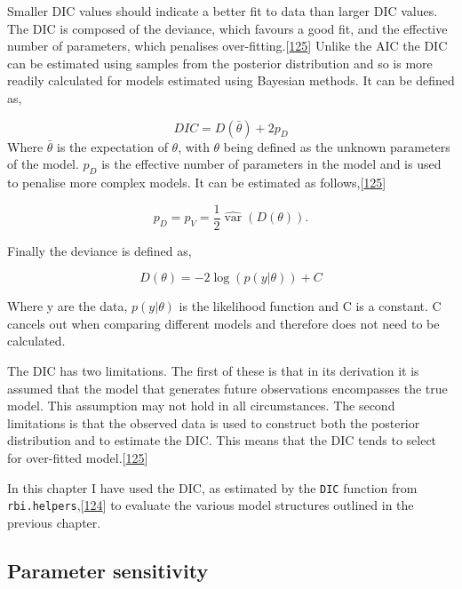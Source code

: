 \documentclass[11pt,twoside]{bristolthesis}
\begin{document}
  Smaller DIC values should indicate a better fit to data than larger DIC values. The DIC is composed of the deviance, which favours a good fit, and the effective number of parameters, which penalises over-fitting.{[}\protect\hyperlink{ref-Gelman:nll_LBlw}{125}{]} Unlike the AIC the DIC can be estimated using samples from the posterior distribution and so is more readily calculated for models estimated using Bayesian methods. It can be defined as,
  
  \[ {\mathit  {DIC}}=D({\bar  {\theta }})+2p_{D}\]
  Where \(\bar{\theta}\) is the expectation of \(\theta\), with \(\theta\) being defined as the unknown parameters of the model. \(p_{D}\) is the effective number of parameters in the model and is used to penalise more complex models. It can be estimated as follows,{[}\protect\hyperlink{ref-Gelman:nll_LBlw}{125}{]}
  
  \[p_{D}=p_{V}={\frac  {1}{2}}\widehat {\operatorname {var}}\left(D(\theta )\right).\]
  
  Finally the deviance is defined as,
  
  \[D(\theta)=-2\log(p(y|\theta ))+C\]
  
  Where y are the data, \(\displaystyle p(y|\theta)\) is the likelihood function and C is a constant. C cancels out when comparing different models and therefore does not need to be calculated.
  
  The DIC has two limitations. The first of these is that in its derivation it is assumed that the model that generates future observations encompasses the true model. This assumption may not hold in all circumstances. The second limitations is that the observed data is used to construct both the posterior distribution and to estimate the DIC. This means that the DIC tends to select for over-fitted model.{[}\protect\hyperlink{ref-Gelman:nll_LBlw}{125}{]}
  
  In this chapter I have used the DIC, as estimated by the \texttt{DIC} function from \texttt{rbi.helpers},{[}\protect\hyperlink{ref-Funk:2019uw}{124}{]} to evaluate the various model structures outlined in the previous chapter.
  
  \hypertarget{parameter-sensitivity}{%
  \subsection{Parameter sensitivity}\label{parameter-sensitivity}}
  
\end{document}
